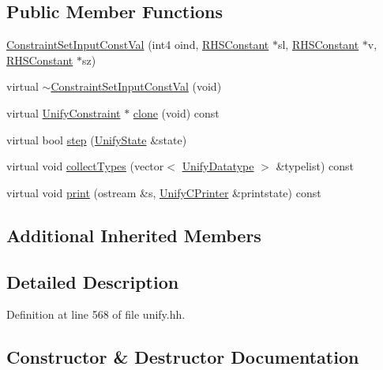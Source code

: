 \subsection*{Public Member Functions}
\begin{DoxyCompactItemize}
\item 
\mbox{\hyperlink{class_constraint_set_input_const_val_af4e1897c6b9435293ae6670bc8618dd7}{Constraint\+Set\+Input\+Const\+Val}} (int4 oind, \mbox{\hyperlink{class_r_h_s_constant}{R\+H\+S\+Constant}} $\ast$sl, \mbox{\hyperlink{class_r_h_s_constant}{R\+H\+S\+Constant}} $\ast$v, \mbox{\hyperlink{class_r_h_s_constant}{R\+H\+S\+Constant}} $\ast$sz)
\item 
virtual \mbox{\hyperlink{class_constraint_set_input_const_val_aa9059ec1910d33b575a7004815be2b9d}{$\sim$\+Constraint\+Set\+Input\+Const\+Val}} (void)
\item 
virtual \mbox{\hyperlink{class_unify_constraint}{Unify\+Constraint}} $\ast$ \mbox{\hyperlink{class_constraint_set_input_const_val_ae54d77177a810e4d67b9d5c528860645}{clone}} (void) const
\item 
virtual bool \mbox{\hyperlink{class_constraint_set_input_const_val_a998952417cd5325d8ba5b6a912dd1b05}{step}} (\mbox{\hyperlink{class_unify_state}{Unify\+State}} \&state)
\item 
virtual void \mbox{\hyperlink{class_constraint_set_input_const_val_a0d99b21ceee2023bb4f3f12ed745b218}{collect\+Types}} (vector$<$ \mbox{\hyperlink{class_unify_datatype}{Unify\+Datatype}} $>$ \&typelist) const
\item 
virtual void \mbox{\hyperlink{class_constraint_set_input_const_val_a0c6e05609e3f895938f504216d585c37}{print}} (ostream \&s, \mbox{\hyperlink{class_unify_c_printer}{Unify\+C\+Printer}} \&printstate) const
\end{DoxyCompactItemize}
\subsection*{Additional Inherited Members}


\subsection{Detailed Description}


Definition at line 568 of file unify.\+hh.



\subsection{Constructor \& Destructor Documentation}
\mbox{\label{class_constraint_set_input_const_val_af4e1897c6b9435293ae6670bc8618dd7}} 

